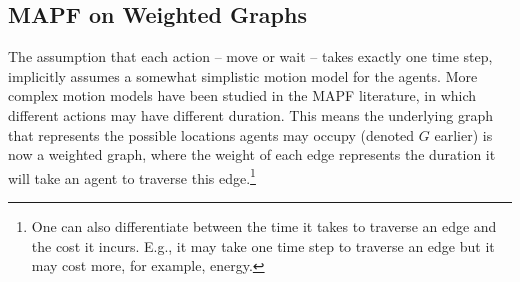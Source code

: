 \documentclass[letterpaper]{article} %
\begin{document}
\subsection{MAPF on Weighted Graphs}
The assumption that each action -- move or wait -- takes exactly one time step, implicitly assumes a somewhat simplistic motion model for the agents.
More complex motion models have been studied in the MAPF literature, in which different actions may have different duration. %
This means the underlying graph that represents the possible locations agents may occupy (denoted $G$ earlier) is now a weighted graph, where the weight of each edge represents the duration it will take an agent to traverse this edge.\footnote{One can also differentiate between the time it takes to traverse an edge and the cost it incurs. E.g., it may take one time step to traverse an edge but it may cost more, for example, energy.}
\end{document}
